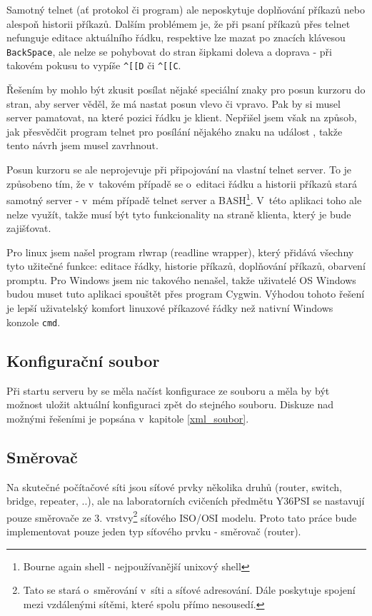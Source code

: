 Samotný telnet (ať protokol či program) ale neposkytuje doplňování příkazů nebo alespoň historii příkazů. Dalším problémem je, že při psaní příkazů přes telnet nefunguje editace aktuálního řádku, respektive lze mazat po znacích klávesou \verb|BackSpace|, ale nelze se pohybovat do stran šipkami doleva a doprava - při takovém pokusu to vypíše \verb|^[[D| či \verb|^[[C|. 

Řešením by mohlo být zkusit posílat nějaké speciální znaky pro posun kurzoru do stran, aby server věděl, že má nastat posun vlevo či vpravo. Pak by si musel server pamatovat, na které pozici řádku je klient. Nepřišel jsem však na způsob, jak přesvědčit program telnet pro posílání nějakého znaku na událost , takže tento návrh jsem musel zavrhnout.

Posun kurzoru se ale neprojevuje při připojování na vlastní telnet server. To je způsobeno tím, že v~takovém případě se o~editaci řádku a historii příkazů stará samotný server - v~mém případě telnet server a BASH\footnote{Bourne again shell - nejpoužívanější unixový shell}. V~této aplikaci toho ale nelze využít, takže musí být tyto funkcionality na straně klienta, který je bude zajišťovat. 

Pro linux jsem našel program rlwrap (readline wrapper), který přidává všechny tyto užitečné funkce: editace řádky, historie příkazů, doplňování příkazů, obarvení promptu. Pro Windows jsem nic takového nenašel, takže uživatelé OS Windows budou muset tuto aplikaci spouštět přes program Cygwin. Výhodou tohoto řešení je lepší uživatelský komfort linuxové příkazové řádky než nativní Windows konzole \verb|cmd|.


\subsection{Konfigurační soubor}
Při startu serveru by se měla načíst konfigurace ze souboru a měla by být možnost uložit aktuální konfiguraci zpět do stejného souboru. Diskuze nad možnými řešeními je popsána v~kapitole \ref{xml_soubor}.


\subsection{Směrovač}
Na skutečné počítačové síti jsou síťové prvky několika druhů (router, switch, bridge, repeater, ..), ale na laboratorních cvičeních předmětu Y36PSI se  nastavují pouze směrovače ze 3. vrstvy\footnote{Tato  se stará o~směrování v~síti a síťové adresování. Dále poskytuje spojení mezi vzdálenými sítěmi, které spolu přímo nesousedí.} síťového ISO/OSI modelu. Proto tato práce bude implementovat pouze jeden typ síťového prvku - směrovač (router). 

